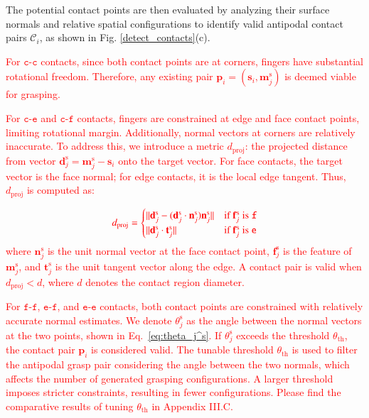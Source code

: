 \documentclass[journal]{IEEEtran}
\newcommand{\rev}[1]{\textcolor{red}{#1}}
\begin{document}
The potential contact points are then evaluated by analyzing their surface normals and relative spatial configurations to identify valid antipodal contact pairs $\mathcal{C}_i$, as shown in Fig. \ref{detect_contacts}(c). 

\rev{For $\mathtt{c}$-$\mathtt{c}$ contacts, since both contact points are at corners, fingers have substantial rotational freedom. Therefore, any existing pair $\mathbf{p}_i = (\mathbf{s}_i, \mathbf{m}_j^\text{s})$ is deemed viable for grasping.}

\rev{For $\mathtt{c}$-$\mathtt{e}$ and $\mathtt{c}$-$\mathtt{f}$ contacts, fingers are constrained at edge and face contact points, limiting rotational margin. Additionally, normal vectors at corners are relatively inaccurate.  
To address this, we introduce a metric $d_{\text{proj}}$: the projected distance from vector $\mathbf{d}_j^\text{s} = \mathbf{m}_j^\text{s} - \mathbf{s}_i$ onto the target vector.  
For face contacts, the target vector is the face normal; for edge contacts, it is the local edge tangent.  Thus, $d_{\text{proj}}$ is computed as:}

\begin{equation}
    \rev{d_{\text{proj}} = \begin{cases}
    \|\mathbf{d}_j^\text{s} - (\mathbf{d}_j^\text{s} \cdot \mathbf{n}_j^\text{s})\mathbf{n}_j^\text{s}\| & \text{if } \mathbf{f}_j^\text{s} \text{ is } \mathtt{f} \\
    \|\mathbf{d}_j^\text{s} \cdot \mathbf{t}_j^\text{s}\| & \text{if } \mathbf{f}_j^\text{s} \text{ is } \mathtt{e}
    \end{cases}}
    \label{eq:proj_d}
\end{equation}
\rev{where $\mathbf{n}_j^\text{s}$ is the unit normal vector at the face contact point, $\mathbf{f}_j^\text{s}$ is the feature of $\mathbf{m}_j^\text{s}$, and $\mathbf{t}_j^\text{s}$ is the unit tangent vector along the edge.  A contact pair is valid when $d_{\text{proj}} < d$, where $d$ denotes the contact region diameter.}

\rev{For $\mathtt{f}$-$\mathtt{f}$, $\mathtt{e}$-$\mathtt{f}$, and $\mathtt{e}$-$\mathtt{e}$ contacts, both contact points are constrained with relatively accurate normal estimates. We denote $\theta_j^\text{s}$ as the angle between the normal vectors at the two points, shown in Eq.~\ref{eq:theta_j^s}.
If $\theta_j^\text{s}$ exceeds the threshold $\theta_{\text{th}}$, the contact pair $\mathbf{p}_i$ is considered valid. The tunable threshold $\theta_{\text{th}}$ is used to filter the antipodal grasp pair considering the angle between the two normals, which affects the number of generated grasping configurations. A larger threshold imposes stricter constraints, resulting in fewer configurations. Please find the comparative results of tuning $\theta_{\text{th}}$ in Appendix III.C.} 
\end{document}
